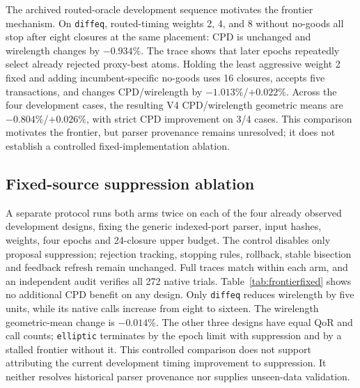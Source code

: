 \documentclass[sigconf,anonymous,review]{acmart}
\begin{document}
The archived routed-oracle development sequence motivates the frontier mechanism. On
\texttt{diffeq}, routed-timing weights 2, 4, and 8 without no-goods all stop
after eight closures at the same placement: CPD is unchanged and wirelength
changes by $-0.934\%$.  The trace shows that later epochs repeatedly select
already rejected proxy-best atoms.  Holding the least aggressive weight 2
fixed and adding incumbent-specific no-goods uses 16 closures, accepts five
transactions, and changes CPD/wirelength by $-1.013\%$/$+0.022\%$.  Across
the four development cases, the resulting V4 CPD/wirelength geometric means
are $-0.804\%$/$+0.026\%$, with strict CPD improvement on 3/4 cases.  This
comparison motivates the frontier, but parser provenance remains unresolved;
it does not establish a controlled fixed-implementation ablation.

\subsection{Fixed-source suppression ablation}

\begin{table}[t]
\centering
\small
\caption{Rejected-singleton suppression enabled versus disabled under the same
source-sealed implementation. Changes use the disabled arm as denominator;
call and accepted-transaction counts are enabled/disabled.}
\label{tab:frontierfixed}

\end{table}

A separate protocol runs both arms twice on each of the four already observed
 development designs, fixing the generic indexed-port parser, input hashes,
weights, four epochs and 24-closure upper budget. The control disables only
proposal suppression; rejection tracking, stopping rules, rollback, stable
bisection and feedback refresh remain unchanged. Full traces match within
each arm, and an independent audit verifies all 272 native trials.
Table~\ref{tab:frontierfixed} shows no additional CPD benefit on any design.
Only \texttt{diffeq} reduces wirelength by five units, while its native calls
increase from eight to sixteen. The wirelength geometric-mean change is
$-0.014\%$. The other three designs have equal QoR and call counts;
\texttt{elliptic} terminates by the epoch limit with suppression and by a
stalled frontier without it. This controlled comparison does not support
attributing the current development timing improvement to suppression.
It neither resolves historical parser provenance nor supplies unseen-data
validation.
\end{document}
